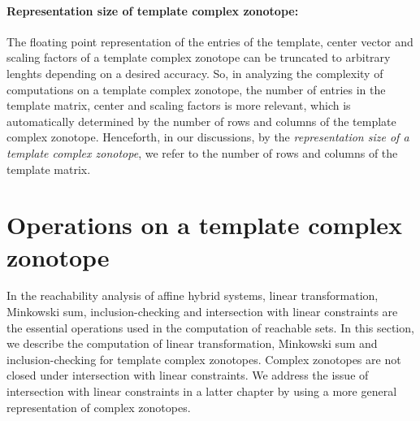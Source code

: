 \paragraph{Representation size of template complex zonotope:}  The
floating point representation of the entries of the template, center
vector and scaling factors of a template complex zonotope can be
truncated to arbitrary lenghts depending on a desired accuracy.  So,
in analyzing the complexity of computations on a template complex
zonotope, the number of entries in the template matrix, center and
scaling factors is more relevant, which is automatically determined by
the number of rows and columns of the template complex zonotope.
Henceforth, in our discussions, by the {\it representation size of a
template complex zonotope}, we refer to the number of rows and columns
of the template matrix.

%
\section{Operations on a template complex zonotope}
In the reachability analysis of affine hybrid systems, linear
transformation, Minkowski sum, inclusion-checking and intersection
with linear constraints are the essential operations used in the
computation of reachable sets.  In this section, we describe the
computation of linear transformation, Minkowski sum and
inclusion-checking for template complex zonotopes.  Complex zonotopes
are not closed under intersection with linear constraints.  We address
the issue of intersection with linear constraints in a latter chapter
by using a more general representation of complex zonotopes.

